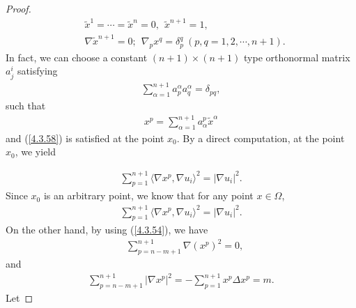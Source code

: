 \documentclass[12pt]{article}
\numberwithin{equation}{section}
\begin{document}
\begin{proof}
\begin{equation}\label{4.3.58}\begin{aligned}&\widetilde{x}^{1}=\cdots=\widetilde{x}^{n}=0,~~\widetilde{x}^{n+1}=1,
\\&\nabla\widetilde{x}^{n+1}=0;~~\nabla_{p}x^{q}=\delta^{q}_{p}~(p,q=1,2,\cdots,n+1).
\end{aligned}\end{equation}
In fact, we can choose a constant $(n+1)\times(n+1)$ type
orthonormal matrix $a^{i}_{j}$
satisfying\begin{equation*}\begin{aligned}\sum^{n+1}_{\alpha=1}a^{\alpha}_{p}a^{\alpha}_{q}=\delta_{pq},
\end{aligned}\end{equation*}
such that
\begin{equation*}\begin{aligned}x^{p}=\sum^{n+1}_{\alpha=1}a^{p}_{\alpha}\widetilde{x}^{\alpha}
\end{aligned}\end{equation*}
and (\ref{4.3.58}) is satisfied at the point $x_{0}$.   By a direct computation, at the
point $x_{0}$,  we yield

\begin{equation*}\begin{aligned}\sum^{n+1}_{p=1}\langle\nabla
x^{p},\nabla
u_{i}\rangle^{2}=|\nabla
u_{i}|^{2}.\end{aligned}\end{equation*} Since $x_{0}$ is an
arbitrary point, we know that for any point $x\in\Omega$,
\begin{equation*}\begin{aligned}\sum^{n+1}_{p=1}\langle\nabla
x^{p},\nabla u_{i}\rangle^{2}=|\nabla
u_{i}|^{2}.\end{aligned}\end{equation*}
On the other hand, by using
(\ref{4.3.54}), we
have\begin{equation}\label{4.3.59}\begin{aligned}&\sum^{n+1}_{p=n-m+1}\nabla(x^{p})^{2}=0,\end{aligned}\end{equation}and
\begin{equation}\label{4.3.60}\begin{aligned}\sum^{n+1}_{p=n-m+1}|\nabla
x^{p}|^{2}=-\sum^{n+1}_{p=1}x^{p}\Delta x^{p}=m.
\end{aligned}\end{equation}
Let


\end{proof}
\end{document}
